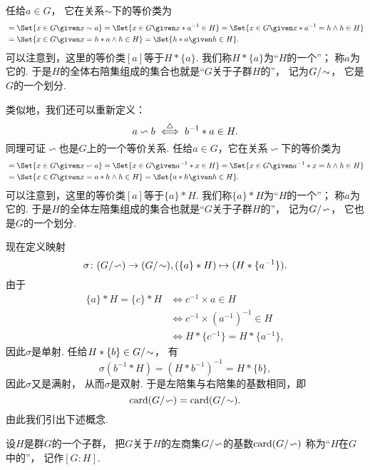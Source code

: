 任给\(a \in G\)，
它在关系\(\sim\)下的等价类为\begin{align*}
	[a] &= \Set{ x \in G \given x \sim a }
	= \Set{ x \in G \given x * a^{-1} \in H }
	= \Set{ x \in G \given x * a^{-1} = h \land h \in H } \\
	&= \Set{ x \in G \given x = h * a \land h \in H }
	= \Set{ h * a \given h \in H }.
\end{align*}
可以注意到，这里的等价类\([a]\)等于\(H * \{a\}\).
我们称\(H * \{a\}\)为“\(H\)的一个”；
称\(a\)为它的.
于是\(H\)的全体右陪集组成的集合也就是“\(G\)关于子群\(H\)的”，
记为\(G/\kern-2pt\sim\)，
它是\(G\)的一个划分.

类似地，我们还可以重新定义：\[
	a \backsim b
	\overset{\triangle}{\iff}
	b^{-1} * a \in H.
\]
同理可证\(\backsim\)也是\(G\)上的一个等价关系.
任给\(a \in G\)，它在关系\(\backsim\)下的等价类为\begin{align*}
	[a] &= \Set{ x \in G \given x \backsim a }
	= \Set{ x \in G \given a^{-1} * x \in H }
	= \Set{ x \in G \given a^{-1} * x = h \land h \in H } \\
	&= \Set{ x \in G \given x = a * h \land h \in H }
	= \Set{ a * h \given h \in H }.
\end{align*}
可以注意到，这里的等价类\([a]\)等于\(\{a\} * H\).
我们称\(\{a\} * H\)为“\(H\)的一个”；
称\(a\)为它的.
于是\(H\)的全体左陪集组成的集合也就是“\(G\)关于子群\(H\)的”，
记为\(G/\kern-2pt\backsim\)，
它也是\(G\)的一个划分.

现在定义映射\[
	\sigma\colon (G/\kern-2pt\backsim) \to (G/\kern-2pt\sim),
	(\{a\} * H) \mapsto (H * \{a^{-1}\}).
\]
由于\begin{align*}
	\{a\} * H = \{c\} * H
	&\iff
	c^{-1} \times a \in H \\
	&\iff
	c^{-1} \times (a^{-1})^{-1} \in H \\
	&\iff
	H * \{c^{-1}\} = H * \{a^{-1}\},
\end{align*}
因此\(\sigma\)是单射.
任给\(H * \{b\} \in G/\kern-2pt\sim\)，
有\[
	\sigma(b^{-1} * H)
	= (H * b^{-1})^{-1}
	= H * \{b\},
\]
因此\(\sigma\)又是满射，
从而\(\sigma\)是双射.
于是左陪集与右陪集的基数相同，即\[
	\operatorname{card}(G/\kern-2pt\backsim) = \operatorname{card}(G/\kern-2pt\sim).
\]
由此我们引出下述概念.
\begin{definition}
设\(H\)是群\(G\)的一个子群，
把\(G\)关于\(H\)的左商集\(G/\kern-2pt\backsim\)的基数\(\operatorname{card}(G/\kern-2pt\backsim)\)
称为“\(H\)在\(G\)中的”，
记作\([G:H]\).
\end{definition}


